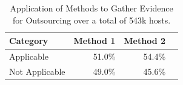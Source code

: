 \begin{table}[!tb]
\small
\centering
\caption{Application of Methods to Gather Evidence for Outsourcing over a total of 543k hosts.}
\begin{tabular}{lrrr}
\hline
\textbf{Category} & \textbf{Method 1} & \textbf{Method 2} \\
\hline
Applicable & 51.0\% & 54.4\% \\
Not Applicable & 49.0\% & 45.6\% \\
\hline
\end{tabular}
\label{tab:apply_methods}
\end{table}
